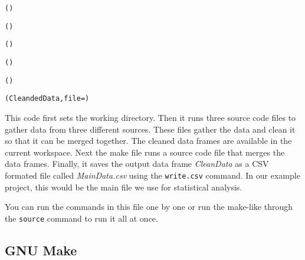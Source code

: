 \begin{knitrout}
\color{fgcolor}\begin{kframe}
\begin{alltt}
\hlcomment{################}
\hlcomment{################}

()

()

()

()
	
()

(CleandedData, file = )
\end{alltt}
\end{kframe}
\end{knitrout}


This code first sets the working directory. Then it runs three source code files to gather data from three different sources. These files gather the data and clean it so that it can be merged together. The cleaned data frames are available in the current workspace. Next the make file runs a source code file that merges the data frames. Finally, it saves the output data frame {\emph{CleanData}} as a CSV formated file called {\emph{MainData.csv}} using the {\tt{write.csv}} command. In our example project, this would be the main file we use for statistical analysis. 

You can run the commands in this file one by one or run the make-like through the \texttt{source} command to run it all at once.

\subsection{GNU Make}

